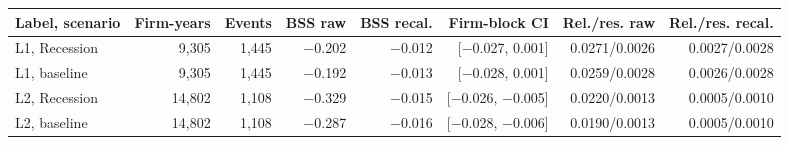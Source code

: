 \begin{tabular}{lrrrrrrr}
\toprule
Label, scenario & Firm-years & Events & BSS raw & BSS recal. & Firm-block CI & Rel./res. raw & Rel./res. recal. \\
\midrule
L1, Recession & 9{,}305 & 1{,}445 & $-$0.202 & $-$0.012 & [$-$0.027, 0.001] & 0.0271/0.0026 & 0.0027/0.0028 \\
L1, baseline & 9{,}305 & 1{,}445 & $-$0.192 & $-$0.013 & [$-$0.028, 0.001] & 0.0259/0.0028 & 0.0026/0.0028 \\
L2, Recession & 14{,}802 & 1{,}108 & $-$0.329 & $-$0.015 & [$-$0.026, $-$0.005] & 0.0220/0.0013 & 0.0005/0.0010 \\
L2, baseline & 14{,}802 & 1{,}108 & $-$0.287 & $-$0.016 & [$-$0.028, $-$0.006] & 0.0190/0.0013 & 0.0005/0.0010 \\
\bottomrule
\end{tabular}
